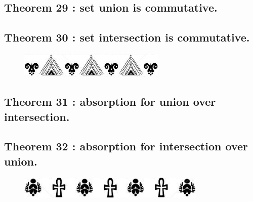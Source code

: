 \documentclass[preview]{standalone}
\begin{document}
\subsection[Set union is commutative.]
    {
        \color{section}Theorem 29 \color{black} : set union is commutative.
    }

\pagebreak


\subsection[Set intersection is commutative.]
    {
        \color{section}Theorem 30 \color{black} : set intersection is commutative.
    }

\vspace{2.9\baselineskip}
\begin{figure}[!h]
    \centering
    \includegraphics[width=7cm]{../resources/jpg/2.2.set.operations/border3.jpg}
\end{figure}
\vspace{2.8\baselineskip}

\subsection[Absorption for union over intersection.]
    {
        \color{section}Theorem 31 \color{black} : absorption for union over intersection.
    }

\pagebreak


\subsection[Absorption for intersection over union.]
    {
        \color{section}Theorem 32 \color{black} : absorption for intersection over union.
    }

\vspace{1.1\baselineskip}
\begin{figure}[!h]
    \centering
    \includegraphics[width=9cm]{../resources/jpg/2.2.set.operations/border4.jpg}
\end{figure}
\vspace{.1\baselineskip}
\end{document}
